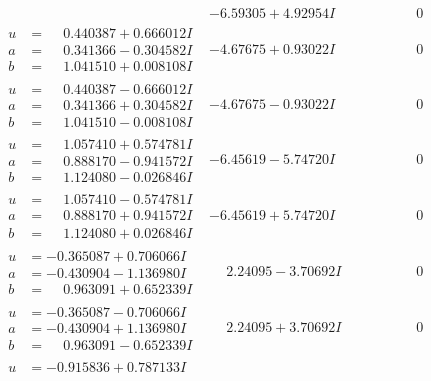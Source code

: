 \documentclass[1p]{elsarticle_modified}
\theoremstyle{definition}
\begin{document}
$$\begin{array}{c|c|c}
 & -6.59305 + 4.92954 I & \phantom{-0.000000 } 0 \\ \hline\begin{aligned}
u &= \phantom{-}0.440387 + 0.666012 I \\
a &= \phantom{-}0.341366 - 0.304582 I \\
b &= \phantom{-}1.041510 + 0.008108 I\end{aligned}
 & -4.67675 + 0.93022 I & \phantom{-0.000000 } 0 \\ \hline\begin{aligned}
u &= \phantom{-}0.440387 - 0.666012 I \\
a &= \phantom{-}0.341366 + 0.304582 I \\
b &= \phantom{-}1.041510 - 0.008108 I\end{aligned}
 & -4.67675 - 0.93022 I & \phantom{-0.000000 } 0 \\ \hline\begin{aligned}
u &= \phantom{-}1.057410 + 0.574781 I \\
a &= \phantom{-}0.888170 - 0.941572 I \\
b &= \phantom{-}1.124080 - 0.026846 I\end{aligned}
 & -6.45619 - 5.74720 I & \phantom{-0.000000 } 0 \\ \hline\begin{aligned}
u &= \phantom{-}1.057410 - 0.574781 I \\
a &= \phantom{-}0.888170 + 0.941572 I \\
b &= \phantom{-}1.124080 + 0.026846 I\end{aligned}
 & -6.45619 + 5.74720 I & \phantom{-0.000000 } 0 \\ \hline\begin{aligned}
u &= -0.365087 + 0.706066 I \\
a &= -0.430904 - 1.136980 I \\
b &= \phantom{-}0.963091 + 0.652339 I\end{aligned}
 & \phantom{-}2.24095 - 3.70692 I & \phantom{-0.000000 } 0 \\ \hline\begin{aligned}
u &= -0.365087 - 0.706066 I \\
a &= -0.430904 + 1.136980 I \\
b &= \phantom{-}0.963091 - 0.652339 I\end{aligned}
 & \phantom{-}2.24095 + 3.70692 I & \phantom{-0.000000 } 0 \\ \hline\begin{aligned}
u &= -0.915836 + 0.787133 I \\

\end{aligned}
\end{array}$$
\end{document}
